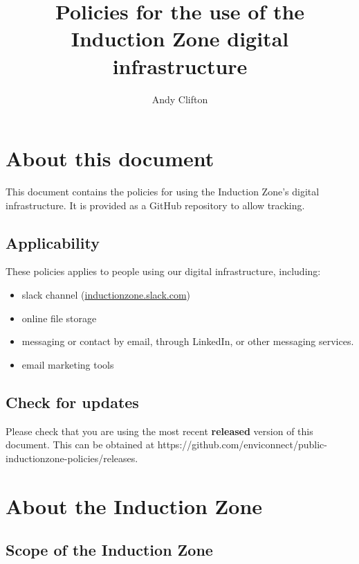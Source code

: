 \documentclass[
  10pt,
  a4paper,
]{article}
\title{Policies for the use of the Induction Zone digital
infrastructure}
\author{Andy Clifton}
\date{}
\providecommand{\tightlist}{%
  \setlength{\itemsep}{0pt}\setlength{\parskip}{0pt}}
\begin{document}
\maketitle

{
\setcounter{tocdepth}{1}
\tableofcontents
}
\hypertarget{about-this-document}{%
\section{About this document}\label{about-this-document}}

This document contains the policies for using the Induction Zone's
digital infrastructure. It is provided as a GitHub repository to allow
tracking.

\hypertarget{applicability}{%
\subsection{Applicability}\label{applicability}}

These policies applies to people using our digital infrastructure,
including:

\begin{itemize}
\tightlist
\item
  slack channel (\url{inductionzone.slack.com})
\item
  online file storage
\item
  messaging or contact by email, through LinkedIn, or other messaging
  services.
\item
  email marketing tools
\end{itemize}

\hypertarget{check-for-updates}{%
\subsection{Check for updates}\label{check-for-updates}}

Please check that you are using the most recent \textbf{released}
version of this document. This can be obtained at
https://github.com/enviconnect/public-inductionzone-policies/releases.

\hypertarget{about-the-induction-zone}{%
\section{About the Induction Zone}\label{about-the-induction-zone}}

\hypertarget{scope-of-the-induction-zone}{%
\subsection{Scope of the Induction
Zone}\label{scope-of-the-induction-zone}}
\end{document}
